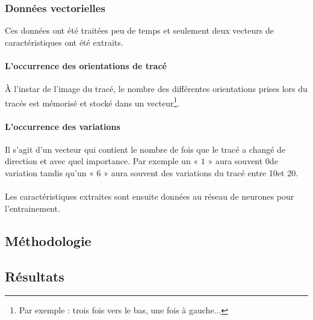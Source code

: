 \subsubsection{Données vectorielles} Ces données ont été traitées peu de temps et seulement deux vecteurs de caractéristiques ont été extraits.

\paragraph{L'occurrence des orientations de tracé} À l'instar de l'image du tracé,  le nombre des différentes orientations prises lors du tracés est mémorisé et stocké dans un vecteur\footnote{Par exemple : trois fois vers le bas, une fois à gauche...}.
\paragraph{L'occurrence des variations} Il s'agit d'un vecteur qui contient le nombre de fois que le tracé a changé de direction et avec quel importance. Par exemple un « $1$ » aura souvent 0\degre de variation tandis qu'un « $6$ » aura souvent des variations du tracé entre 10\degre et 20\degre.


\paragraph{} Les caractéristiques extraites sont ensuite données au réseau de neurones pour l'entrainement.
\subsection{Méthodologie}

\subsection{Résultats}

